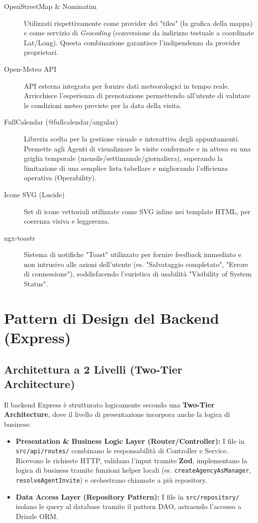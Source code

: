 \begin{description}
    \item[OpenStreetMap \& Nominatim] Utilizzati rispettivamente come provider dei "tiles" (la grafica della mappa) e come servizio di \textit{Geocoding} (conversione da indirizzo testuale a coordinate Lat/Long). Questa combinazione garantisce l'indipendenza da provider proprietari.
    \item[Open-Meteo API] API esterna integrata per fornire dati meteorologici in tempo reale. Arricchisce l'esperienza di prenotazione permettendo all'utente di valutare le condizioni meteo previste per la data della visita.
    \item[FullCalendar (@fullcalendar/angular)] Libreria scelta per la gestione visuale e interattiva degli appuntamenti. Permette agli Agenti di visualizzare le visite confermate e in attesa su una griglia temporale (mensile/settimanale/giornaliera), superando la limitazione di una semplice lista tabellare e migliorando l'efficienza operativa (Operability).
    \item[Icone SVG (Lucide)] Set di icone vettoriali utilizzate come SVG inline nei template HTML, per coerenza visiva e leggerezza.
    \item[ngx-toastr] Sistema di notifiche "Toast" utilizzato per fornire feedback immediato e non intrusivo alle azioni dell'utente (es. "Salvataggio completato", "Errore di connessione"), soddisfacendo l'euristica di usabilità "Visibility of System Status".
\end{description}

\section{Pattern di Design del Backend (Express)}

\subsection{Architettura a 2 Livelli (Two-Tier Architecture)}
Il backend Express è strutturato logicamente secondo una \textbf{Two-Tier Architecture}, 
dove il livello di presentazione incorpora anche la logica di business:
\begin{itemize}
    \item \textbf{Presentation \& Business Logic Layer (Router/Controller):} I file in 
    \texttt{src/api/routes/} combinano le responsabilità di Controller e Service. 
    Ricevono le richieste HTTP, validano l'input tramite \textbf{Zod}, implementano 
    la logica di business tramite funzioni helper locali (es. \texttt{createAgencyAsManager}, 
    \texttt{resolveAgentInvite}) e orchestrano chiamate a più repository.
    \item \textbf{Data Access Layer (Repository Pattern):} I file in \texttt{src/repository/} 
    isolano le query al database tramite il pattern DAO, astraendo l'accesso a Drizzle ORM.
\end{itemize}

